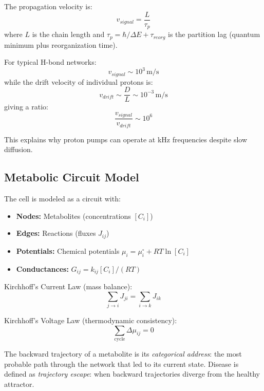 \documentclass[12pt,a4paper]{article}
\begin{document}
The propagation velocity is:
\begin{equation}
v_{signal} = \frac{L}{\tau_p}
\end{equation}
where $L$ is the chain length and $\tau_p = \hbar/\Delta E + \tau_{reorg}$ is the partition lag (quantum minimum plus reorganization time).

For typical H-bond networks:
\begin{equation}
v_{signal} \sim 10^3 \, \text{m/s}
\end{equation}
while the drift velocity of individual protons is:
\begin{equation}
v_{drift} \sim \frac{D}{L} \sim 10^{-3} \, \text{m/s}
\end{equation}
giving a ratio:
\begin{equation}
\frac{v_{signal}}{v_{drift}} \sim 10^6
\end{equation}

This explains why proton pumps can operate at kHz frequencies despite slow diffusion.

\subsection{Metabolic Circuit Model}

The cell is modeled as a circuit with:
\begin{itemize}
\item \textbf{Nodes:} Metabolites (concentrations $[C_i]$)
\item \textbf{Edges:} Reactions (fluxes $J_{ij}$)
\item \textbf{Potentials:} Chemical potentials $\mu_i = \mu_i^\circ + RT \ln[C_i]$
\item \textbf{Conductances:} $G_{ij} = k_{ij}[C_i]/(RT)$
\end{itemize}

Kirchhoff's Current Law (mass balance):
\begin{equation}
\sum_{j \to i} J_{ji} = \sum_{i \to k} J_{ik}
\end{equation}

Kirchhoff's Voltage Law (thermodynamic consistency):
\begin{equation}
\sum_{\text{cycle}} \Delta \mu_{ij} = 0
\end{equation}

The backward trajectory of a metabolite is its \textit{categorical address}: the most probable path through the network that led to its current state. Disease is defined as \textit{trajectory escape}: when backward trajectories diverge from the healthy attractor.
\end{document}
